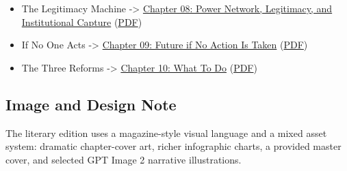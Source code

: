 \documentclass[
  american,
  12pt,
  letterpaper,
]{article}
\begin{document}
\begin{itemize}
\item
  The Legitimacy Machine -\textgreater{}
  \href{../../papers/html/08_legitimacy-and-institutional-capture_paper.html}{Chapter
  08: Power Network, Legitimacy, and Institutional Capture}
  (\href{../../papers/pdf/08_legitimacy-and-institutional-capture_paper/08_legitimacy-and-institutional-capture_paper.pdf}{PDF})
\item
  If No One Acts -\textgreater{}
  \href{../../papers/html/09_future-if-unchecked_paper.html}{Chapter 09:
  Future if No Action Is Taken}
  (\href{../../papers/pdf/09_future-if-unchecked_paper/09_future-if-unchecked_paper.pdf}{PDF})
\item
  The Three Reforms -\textgreater{}
  \href{../../papers/html/10_three-reform-program_paper.html}{Chapter
  10: What To Do}
  (\href{../../papers/pdf/10_three-reform-program_paper/10_three-reform-program_paper.pdf}{PDF})
\end{itemize}

\subsection{Image and Design Note}\label{image-and-design-note}

The literary edition uses a magazine-style visual language and a mixed
asset system: dramatic chapter-cover art, richer infographic charts, a
provided master cover, and selected GPT Image 2 narrative illustrations.
\end{document}
